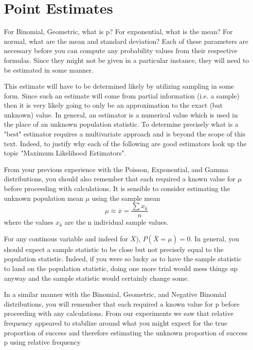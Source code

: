 \documentclass[10pt,]{book}
\numberwithin{equation}{section}
\begin{document}
\section[{Point Estimates}]{Point Estimates}\label{section-67}
\hypertarget{p-1102}{}%
For Binomial, Geometric, what is p? For exponential, what is the mean?  For normal, what are the mean and standard deviation? Each of these parameters are necessary before you can compute any probability values from their respective formulas. Since they might not be given in a particular instance, they will need to be estimated in some manner.%
\par
\hypertarget{p-1103}{}%
This estimate will have to be determined likely by utilizing sampling in some form. Since such an estimate will come from partial information (i.e. a sample) then it is very likely going to only be an approximation to the exact (but unknown) value. In general, an estimator is a numerical value which is used in the place of an unknown population statistic. To determine precisely what is a "best" estimator requires a multivariate approach and is beyond the scope of this text. Indeed, to justify why each of the following are good estimators look up the topic "Maximum Likelihood Estimators".%
\par
\hypertarget{p-1104}{}%
From your previous experience with the Poisson, Exponential, and Gamma distributions, you should also remember that each required a known value for \(\mu\) before proceeding with calculations.  It is sensible to consider estimating the unknown population mean \(\mu\) using the sample mean%
\begin{equation*}
\mu \approx \overline{x} = \frac{\sum x_k}{n}
\end{equation*}
where the values \(x_k\) are the n individual sample values.%
\par
\hypertarget{p-1105}{}%
For any continous variable and indeed for \(\overline{X}\)), \(P(\overline{X} = \mu) = 0\). In general, you should expect a sample statistic to be close but not precisely equal to the population statistic. Indeed, if you were so lucky as to have the sample statistic to land on the population statistic, doing one more trial would mess things up anyway and the sample statistic would certainly change some.%
\par
\hypertarget{p-1106}{}%
In a similar manner with the Binomial, Geometric, and Negative Binomial distributions, you will remember that each required a known value for p before  proceeding with any calculations. From our experiments we saw that relative frequency appeared to stabilize around what you might expect for the true proportion of success and therefore estimating the unknown proportion of success p using relative frequency%
\end{document}
